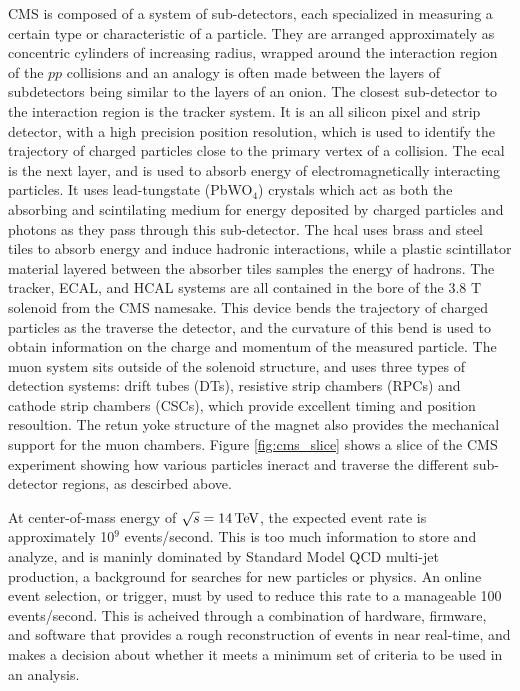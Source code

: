 \par CMS is composed of a system of sub-detectors, each
specialized in measuring a certain type or characteristic of a
particle.  They are arranged approximately as concentric cylinders of
increasing radius, wrapped around the interaction region of the $pp$
collisions and an analogy is often made between the layers of
subdetectors being similar to the layers of an onion. The closest 
sub-detector to the interaction region is the tracker system.  It is
an all silicon pixel and strip detector, with a high precision 
position resolution, which is used to identify the trajectory of
charged particles close to the primary vertex of a collision.  The
\acrfull{ecal} is the next layer, and is used to absorb energy of
electromagnetically interacting particles.  It uses lead-tungstate
(PbWO$_{4}$) crystals which act as both the absorbing and scintilating
medium for energy deposited by charged particles and photons as they
pass through  this sub-detector.  The \acrfull{hcal} uses brass and
steel tiles to absorb energy and induce hadronic interactions, while a
plastic scintillator material layered between the absorber tiles
samples the energy of hadrons.  The tracker, ECAL, and HCAL systems
are all contained in the bore of the 3.8 T solenoid from the CMS
namesake.  This device bends the trajectory of charged particles as
the traverse the detector, and the curvature of this bend is used to
obtain information on the charge and momentum of the measured
particle.  The muon system sits outside of the solenoid structure, and
uses three types of detection systems: drift tubes (DTs), resistive
strip chambers (RPCs) and cathode strip chambers (CSCs), which provide
excellent timing and position resoultion.  The retun yoke structure of
the magnet also provides the mechanical support for the muon
chambers.  Figure \ref{fig:cms_slice} shows a slice of the CMS
experiment showing how various particles ineract and traverse the different
sub-detector regions, as descirbed above.  

\par At center-of-mass energy of $\sqrt{s}=14 \,\text{Te\hspace{-.08em}V}$, the expected
event rate is approximately 10$^{9}$ events/second.  This is too much
information to store and analyze, and is maninly dominated by Standard
Model QCD multi-jet production, a background for searches for new
particles or physics.  An online event selection, or trigger, must by
used to reduce this rate to a manageable 100 events/second.  This is
acheived through a combination of hardware, firmware, and software
that provides a rough reconstruction of events in near real-time, and
makes a decision about whether it meets a minimum set of criteria to
be used in an analysis.  


